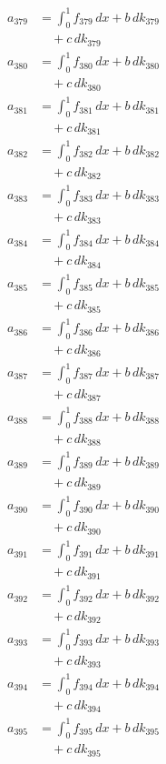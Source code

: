 \documentclass{article}
\begin{document}
\begin{align}
a_{379} &= \int_0^1 f_{379}\,dx + b\,dk_{379} \\
&\quad + c\,dk_{379} \\
a_{380} &= \int_0^1 f_{380}\,dx + b\,dk_{380} \\
&\quad + c\,dk_{380} \\
a_{381} &= \int_0^1 f_{381}\,dx + b\,dk_{381} \\
&\quad + c\,dk_{381} \\
a_{382} &= \int_0^1 f_{382}\,dx + b\,dk_{382} \\
&\quad + c\,dk_{382} \\
a_{383} &= \int_0^1 f_{383}\,dx + b\,dk_{383} \\
&\quad + c\,dk_{383} \\
a_{384} &= \int_0^1 f_{384}\,dx + b\,dk_{384} \\
&\quad + c\,dk_{384} \\
a_{385} &= \int_0^1 f_{385}\,dx + b\,dk_{385} \\
&\quad + c\,dk_{385} \\
a_{386} &= \int_0^1 f_{386}\,dx + b\,dk_{386} \\
&\quad + c\,dk_{386} \\
a_{387} &= \int_0^1 f_{387}\,dx + b\,dk_{387} \\
&\quad + c\,dk_{387} \\
a_{388} &= \int_0^1 f_{388}\,dx + b\,dk_{388} \\
&\quad + c\,dk_{388} \\
a_{389} &= \int_0^1 f_{389}\,dx + b\,dk_{389} \\
&\quad + c\,dk_{389} \\
a_{390} &= \int_0^1 f_{390}\,dx + b\,dk_{390} \\
&\quad + c\,dk_{390} \\
a_{391} &= \int_0^1 f_{391}\,dx + b\,dk_{391} \\
&\quad + c\,dk_{391} \\
a_{392} &= \int_0^1 f_{392}\,dx + b\,dk_{392} \\
&\quad + c\,dk_{392} \\
a_{393} &= \int_0^1 f_{393}\,dx + b\,dk_{393} \\
&\quad + c\,dk_{393} \\
a_{394} &= \int_0^1 f_{394}\,dx + b\,dk_{394} \\
&\quad + c\,dk_{394} \\
a_{395} &= \int_0^1 f_{395}\,dx + b\,dk_{395} \\
&\quad + c\,dk_{395} \\

\end{align}
\end{document}
